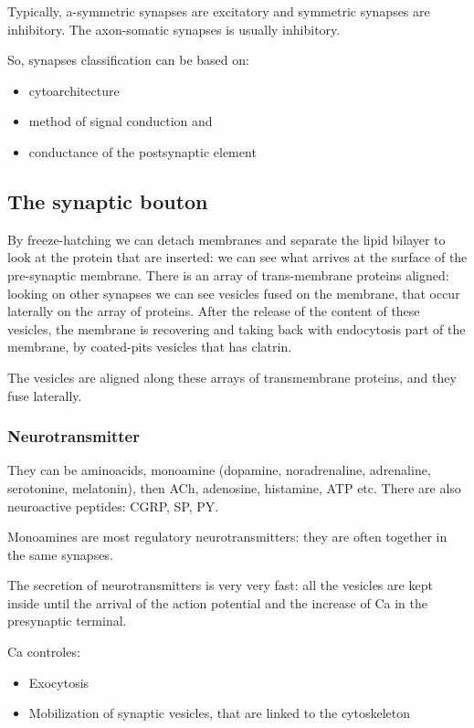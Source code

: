 \documentclass[a4paper, 12pt]{book}
\begin{document}
Typically, a-symmetric synapses are excitatory and symmetric synapses are inhibitory. The axon-somatic synapses is usually inhibitory.

So, synapses classification can be based on:
\begin{itemize}
\item{cytoarchitecture}
\item{ method of signal conduction and}
\item{ conductance of the postsynaptic element}
\end{itemize}


\subsection{The synaptic bouton}
By freeze-hatching we can detach membranes and separate the lipid  bilayer to look at the protein that are inserted:  we can see what arrives at the surface of the pre-synaptic membrane. There is an array of trans-membrane proteins aligned: looking on other synapses we can see vesicles fused on the membrane, that occur laterally on the array of proteins. After the release of the content of these vesicles, the membrane is recovering and taking back with endocytosis part of the membrane, by coated-pits vesicles that has clatrin.

The vesicles are aligned along these arrays of transmembrane proteins, and they fuse laterally. 

\subsubsection{Neurotransmitter}
They can be aminoacids, monoamine (dopamine, noradrenaline, adrenaline, serotonine, melatonin), then ACh, adenosine, histamine, ATP etc. There are also neuroactive peptides: CGRP, SP, PY.

Monoamines are most regulatory neurotransmitters: they are often together in the same synapses.

The secretion of neurotransmitters is very very fast: all the vesicles are kept inside until the arrival of the action potential and the increase of Ca in the presynaptic terminal.

Ca controles:
\begin{itemize}
\item{Exocytosis}
\item{Mobilization of synaptic vesicles, that are linked to the cytoskeleton}
\end{itemize}
\end{document}

